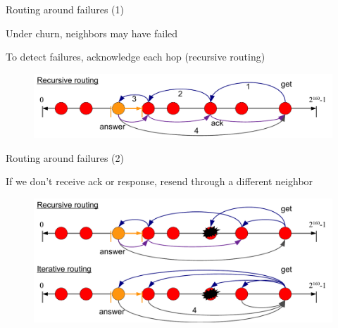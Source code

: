 \begin{frame}{Routing around failures (1)}

\BI
\item Under churn, neighbors may have failed
\item To detect failures, acknowledge each hop (recursive routing)
\EI

\begin{figure}
	\includegraphics[width=\textwidth]{figs/10/dht-route-failure}
\end{figure}

\end{frame}

\begin{frame}{Routing around failures (2)}

\BI
\item If we don't receive ack or response, resend through a different neighbor
\EI

\begin{figure}
	\includegraphics[width=\textwidth]{figs/10/dht-route-failure2}
\end{figure}

\end{frame}

